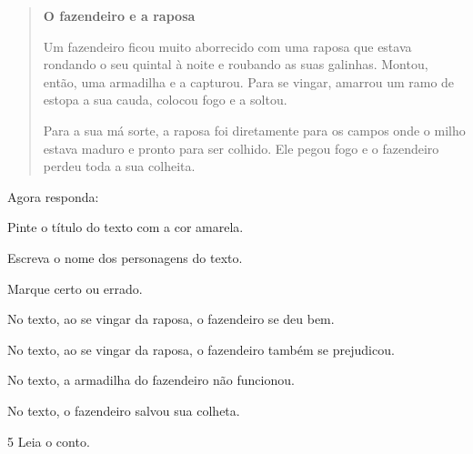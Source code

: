 \begin{quote}
\textbf{O fazendeiro e a raposa}

Um fazendeiro ficou muito aborrecido com uma raposa que estava rondando o
seu quintal à noite e roubando as suas galinhas. Montou, então, uma
armadilha e a capturou. Para se vingar, amarrou um ramo de estopa
a sua cauda, colocou fogo e a soltou.

Para a sua má sorte, a raposa foi diretamente para os campos onde o milho
estava maduro e pronto para ser colhido. Ele pegou fogo e o fazendeiro perdeu toda a sua colheita.

\end{quote}

Agora responda:

\begin{escolha}
\item Pinte o título do texto com a cor amarela.

\item Escreva o nome dos personagens do texto.


\item Marque certo ou errado.

\begin{boxlist}
 No texto, ao se vingar da raposa, o fazendeiro se deu bem.

 No texto, ao se vingar da raposa, o fazendeiro também se prejudicou.

 No texto, a armadilha do fazendeiro não funcionou.

 No texto, o fazendeiro salvou sua colheta.
\end{boxlist}
\end{escolha}

\num{5} Leia o conto.


